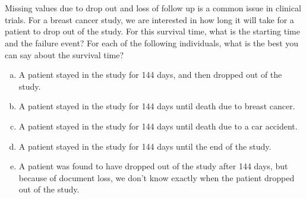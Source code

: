 \documentclass[12pt]{elegantbook}
\begin{document}

\chapter{}

    \begin{exercise}
        Missing values due to drop out and loss of follow up is a common issue in clinical trials. For a breast cancer study, we are interested in how long it will take for a patient to drop out of the study. For this survival time, what is the starting time and the failure event? For each of the following individuals, what is the best you can say about the survival time?
        \begin{enumerate}[(a)]
            \item A patient stayed in the study for 144 days, and then dropped out of the study.
            \item A patient stayed in the study for 144 days until death due to breast cancer.
            \item A patient stayed in the study for 144 days until death due to a car accident.
            \item A patient stayed in the study for 144 days until the end of the study.
            \item A patient was found to have dropped out of the study after 144 days, but because of document loss, we don't know exactly when the patient dropped out of the study. 
        \end{enumerate}
    \end{exercise}

    \begin{solution}
    \end{solution}
\end{document}
